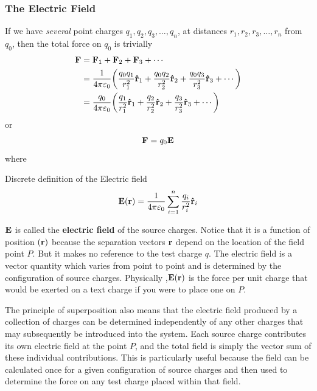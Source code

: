 	\subsubsection{The Electric Field}
		If we have \textit{several} point charges $q_1,q_2,q_3,\ldots,q_n$, at distances
		$r_1,r_2,r_3,\ldots,r_n$ from $q_0$, then the total force on $q_0$ is trivially
		\begin{align*}
			\vb{F} &= \vb{F}_1 + \vb{F}_2 + \vb{F}_3 + \cdots \\
				   &= \frac{1}{4\pi\varepsilon_0} \qty(
						\frac{q_0q_1}{r_1^2}\vu{r}_1 + 
						\frac{q_0q_2}{r_2^2}\vu{r}_2 + 
						\frac{q_0q_3}{r_3^2}\vu{r}_3 + 
					  \cdots )\\
				   &= \frac{q_0}{4\pi\varepsilon_0} \qty(
						\frac{q_1}{r_1^2}\vu{r}_1 + 
						\frac{q_2}{r_2^2}\vu{r}_2 + 
						\frac{q_3}{r_3^2}\vu{r}_3 + 
					  \cdots )\\
		\end{align*}
		or
		\begin{equation}
		    \vb{F} = q_0 \vb{E}
		\end{equation}
		where
		\begin{definition}{Discrete definition of the Electric field}
			\begin{equation} \label{eq: discrete E}
				\vb{E}(\vb{r}) = \frac{1}{4\pi\varepsilon_0}\sum_{i=1}^n \frac{q_i}{r_i^2}\vu{r}_i  
			\end{equation}
		\end{definition}
		$\vb{E}$ is called the \textbf{electric field} of the source charges. Notice that it is 
		a function of position $(\vb{r})$ because the separation vectors $\vb{r}$ depend on the location of 
		the field point $P$. But it makes no reference to the test charge $q$. The electric field is a vector
		quantity which varies from point to point and is determined by the configuration of 
		source charges. Physically ,$\vb{E}(\vb{r})$ is the force per unit charge that would
		be exerted on a text charge if you were to place one on $P$.

		The principle of superposition also means that the electric field produced by a
		collection of charges can be determined independently of any other charges that
		may subsequently be introduced into the system. Each source charge contributes its 
		own electric field at the point $P$, and the total field is simply the vector sum
		of these individual contributions. This is particularly useful because the field 
		can be calculated once for a given configuration of source charges and then used
		to determine the force on any test charge placed within that field.
		\newpage
